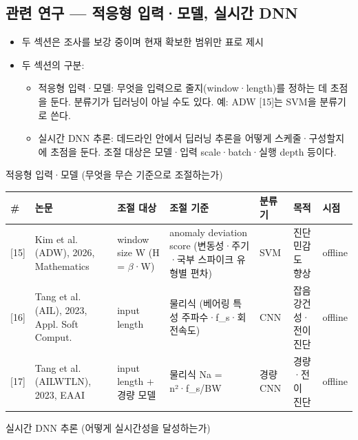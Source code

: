 \documentclass[10pt]{article}
\begin{document}
\subsection{관련 연구 --- 적응형 입력·모델, 실시간 DNN}
\begin{itemize}
\item 두 섹션은 조사를 보강 중이며 현재 확보한 범위만 표로 제시
\item 두 섹션의 구분:
\begin{itemize}
\item 적응형 입력·모델: 무엇을 입력으로 줄지(window·length)를 정하는 데 초점을 둔다. 분류기가 딥러닝이 아닐 수도 있다. 예: ADW [15]는 SVM을 분류기로 쓴다.
\item 실시간 DNN 추론: 데드라인 안에서 딥러닝 추론을 어떻게 스케줄·구성할지에 초점을 둔다. 조절 대상은 모델·입력 scale·batch·실행 depth 등이다.
\end{itemize}
\end{itemize}
\noindent 적응형 입력·모델 (무엇을 무슨 기준으로 조절하는가)
\begin{center}\scriptsize
\begin{tabular}{@{}C{0.6cm}L{2.5cm}L{2.3cm}L{3.6cm}L{1.3cm}L{1.7cm}L{1.2cm}@{}}
\toprule
\# & 논문 & 조절 대상 & 조절 기준 & 분류기 & 목적 & 시점 \\ \midrule
{[15]} & Kim et al. (ADW), 2026, Mathematics & window size W (H = $\beta$·W) & anomaly deviation score (변동성·주기·국부 스파이크 유형별 편차) & SVM & 진단 민감도 향상 & offline \\
{[16]} & Tang et al. (AIL), 2023, Appl. Soft Comput. & input length & 물리식 (베어링 특성 주파수·f\_s·회전속도) & CNN & 잡음 강건성·전이 진단 & offline \\
{[17]} & Tang et al. (AILWTLN), 2023, EAAI & input length + 경량 모델 & 물리식 Na = n²·f\_s/BW & 경량 CNN & 경량·전이 진단 & offline \\
\bottomrule
\end{tabular}
\end{center}
\noindent 실시간 DNN 추론 (어떻게 실시간성을 달성하는가)
\end{document}
